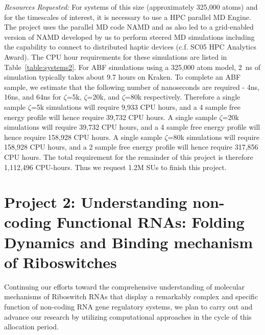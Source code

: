 \documentclass[a4paper,10pt]{article}
\newcommand{\up}{\vspace*{-1em}}
\begin{document}
{\it Resources Requested: } For systems of this size (approximately 325,000 atoms) and for the timescales of interest, it is necessary to use a HPC parallel MD Engine.  The project uses the parallel MD code NAMD and as also led to a grid-enabled version of NAMD developed by us to perform steered MD simulations including the capability to connect to distributed haptic devices (c.f. SC05 HPC Analytics Award). %
The CPU hour requirements for these simulations are listed in Table~\ref{table:systems2}. For ABF simulations using a 325,000 atom model, 2~ns of simulation typically takes about 9.7 hours on Kraken. To complete an ABF sample, we estimate that the following number of nanoseconds are required - 4ns, 16ns, and 64ns for $\zeta$=5k, $\zeta$=20k, and $\zeta$=80k respectively. Therefore a single sample $\zeta$=5k simulations will require 9,933 CPU hours, and a 4 sample free energy profile will hence require 39,732 CPU hours. A single sample $\zeta$=20k simulations will require 39,732 CPU hours, and a 4 sample free energy profile will hence require 158,928 CPU hours. A single sample $\zeta$=80k simulations will require 158,928 CPU hours, and a 2 sample free energy profile will hence require 317,856 CPU hours. The total requirement for the remainder of this project is therefore 1,112,496 CPU-hours. Thus we request 1.2M SUs to finish this project.


\up\up
\section*{Project 2: Understanding non-coding Functional RNAs: Folding Dynamics and Binding mechanism of Riboswitches}
\up

Continuing our efforts toward the comprehensive understanding of molecular mechanisms of Riboswitch RNAs that display a remarkably complex and specific function of non-coding RNA gene regulatory systems, we plan to carry out and advance our research by utilizing computational approaches in the cycle of this allocation period.  
\end{document}
